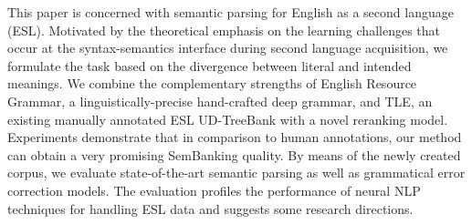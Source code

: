 This paper is concerned with semantic parsing for English as a second language (ESL). Motivated by the theoretical emphasis on the learning challenges that occur at the syntax-semantics interface during second language acquisition, we formulate the task based on the divergence between literal and intended meanings. We combine the complementary strengths of English Resource Grammar, a linguistically-precise hand-crafted deep grammar, and TLE, an existing manually annotated ESL UD-TreeBank with a novel reranking model. Experiments demonstrate that in comparison to human annotations, our method can obtain a very promising SemBanking quality. By means of the newly created corpus, we evaluate state-of-the-art semantic parsing as well as grammatical error correction models. The evaluation profiles the performance of neural NLP techniques for handling ESL data and suggests some research directions.
